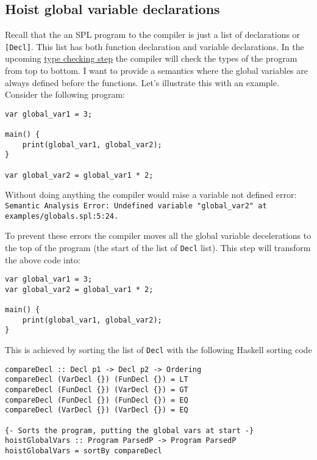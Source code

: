 \documentclass{report}
\begin{document}
\subsection{Hoist global variable declarations} \label{sec:Hoist-globals}

Recall that the an SPL program to the compiler is just a list of declarations or \texttt{[Decl]}. This list has both function declaration and variable declarations. In the upcoming \hyperref[sec:Type-Checking]{type checking step} the compiler will check the types of the program from top to bottom. I want to provide a semantics where the global variables are always defined before the functions. 
Let's illustrate this with an example. Consider the following program:

\begin{lstlisting}[style=SPL]
var global_var1 = 3;

main() {
    print(global_var1, global_var2);
}

var global_var2 = global_var1 * 2;
\end{lstlisting}

\noindent Without doing anything the compiler would raise a variable not defined error:
\\\texttt{\textcolor{error}{Semantic Analysis Error: Undefined variable "\textcolor{name}{global\_var2}" at} \textcolor{filename}{examples/globals.spl:5:24}.}

To prevent these errors the compiler moves all the global variable decelerations to the top of the program (the start of the list of \texttt{Decl} list). This step will transform the above code into: 

\begin{lstlisting}[style=SPL]
var global_var1 = 3;
var global_var2 = global_var1 * 2;

main() {
    print(global_var1, global_var2);
}
\end{lstlisting}

\noindent This is achieved by sorting the list of \texttt{Decl} with the following Haskell sorting code

\begin{verbatim}
compareDecl :: Decl p1 -> Decl p2 -> Ordering
compareDecl (VarDecl {}) (FunDecl {}) = LT
compareDecl (FunDecl {}) (VarDecl {}) = GT
compareDecl (FunDecl {}) (FunDecl {}) = EQ
compareDecl (VarDecl {}) (VarDecl {}) = EQ

{- Sorts the program, putting the global vars at start -}
hoistGlobalVars :: Program ParsedP -> Program ParsedP
hoistGlobalVars = sortBy compareDecl
\end{verbatim}
\end{document}
